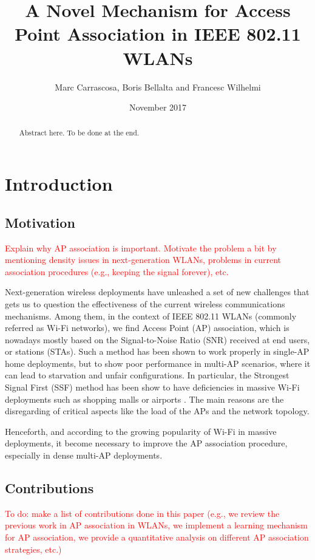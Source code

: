 \documentclass{article}
\title{A Novel Mechanism for Access Point Association in IEEE 802.11 WLANs}
\author{Marc Carrascosa, Boris Bellalta and Francesc Wilhelmi}
\date{November 2017}
\begin{document}
\maketitle

\begin{abstract}
	Abstract here. To be done at the end.
\end{abstract}

\tableofcontents
\newpage

\section{Introduction}
\label{section:introduction}
	
	\subsection{Motivation}
	\label{section:motivation}
		\textcolor{red}{Explain why AP association is important. Motivate the problem a bit by mentioning density issues in next-generation WLANs, problems in current association procedures (e.g., keeping the signal forever), etc.}

		Next-generation wireless deployments have unleashed a set of new challenges that gets us to question the effectiveness of the current wireless communications mechanisms. Among them, in the context of IEEE 802.11 WLANs (commonly referred as Wi-Fi networks), we find Access Point (AP) association, which is nowadays mostly based on the Signal-to-Noise Ratio (SNR) received at end users, or stations (STAs). Such a method has been shown to work properly in single-AP home deployments, but to show poor performance in multi-AP scenarios, where it can lead to starvation and unfair configurations. In particular, the Strongest Signal First (SSF) method has been show to have deficiencies in massive Wi-Fi deployments such as shopping malls or airports \cite{judd2004, anand2002}. The main reasons are the disregarding of critical aspects like the load of the APs and the network topology.  
		
		Henceforth, and according to the growing popularity of Wi-Fi in massive deployments, it become necessary to improve the AP association procedure, especially in dense multi-AP deployments. 	
	
	\subsection{Contributions}
	\label{section:contributions}
		\textcolor{red}{To do: make a list of contributions done in this paper (e.g., we review the previous work in AP association in WLANs, we implement a learning mechanism for AP association, we provide a quantitative analysis on different AP association strategies, etc.)}
		
\end{document}
